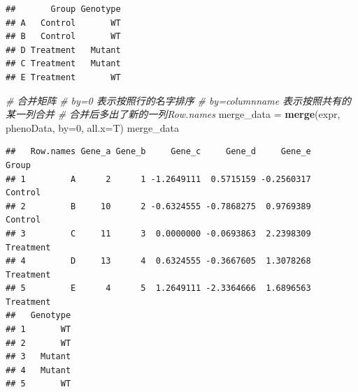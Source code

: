 \documentclass[]{article}
\newenvironment{Shaded}{\begin{snugshade}}{\end{snugshade}}
\newcommand{\KeywordTok}[1]{\textcolor[rgb]{0.13,0.29,0.53}{\textbf{{#1}}}}
\newcommand{\DataTypeTok}[1]{\textcolor[rgb]{0.13,0.29,0.53}{{#1}}}
\newcommand{\DecValTok}[1]{\textcolor[rgb]{0.00,0.00,0.81}{{#1}}}
\newcommand{\StringTok}[1]{\textcolor[rgb]{0.31,0.60,0.02}{{#1}}}
\newcommand{\CommentTok}[1]{\textcolor[rgb]{0.56,0.35,0.01}{\textit{{#1}}}}
\newcommand{\NormalTok}[1]{{#1}}
\numberwithin{figure}{section}
\numberwithin{table}{section}
\theoremstyle{definition}
\theoremstyle{definition}
\theoremstyle{definition}
\theoremstyle{remark}
\begin{document}
\begin{Shaded}
\end{Shaded}

\begin{verbatim}
##       Group Genotype
## A   Control       WT
## B   Control       WT
## D Treatment   Mutant
## C Treatment   Mutant
## E Treatment       WT
\end{verbatim}

\begin{Shaded}
\begin{Highlighting}[]
\CommentTok{# 合并矩阵}
\CommentTok{# by=0 表示按照行的名字排序}
\CommentTok{# by=columnname 表示按照共有的某一列合并}
\CommentTok{# 合并后多出了新的一列Row.names}
\NormalTok{merge_data =}\StringTok{ }\KeywordTok{merge}\NormalTok{(expr, phenoData, }\DataTypeTok{by=}\DecValTok{0}\NormalTok{, }\DataTypeTok{all.x=}\NormalTok{T)}
\NormalTok{merge_data}
\end{Highlighting}
\end{Shaded}

\begin{verbatim}
##   Row.names Gene_a Gene_b     Gene_c     Gene_d     Gene_e     Group
## 1         A      2      1 -1.2649111  0.5715159 -0.2560317   Control
## 2         B     10      2 -0.6324555 -0.7868275  0.9769389   Control
## 3         C     11      3  0.0000000 -0.0693863  2.2398309 Treatment
## 4         D     13      4  0.6324555 -0.3667605  1.3078268 Treatment
## 5         E      4      5  1.2649111 -2.3364666  1.6896563 Treatment
##   Genotype
## 1       WT
## 2       WT
## 3   Mutant
## 4   Mutant
## 5       WT
\end{verbatim}

\begin{Shaded}
\end{Shaded}
\end{document}
